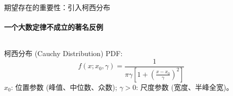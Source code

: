 \documentclass[UTF8]{beamer}
\begin{document}
\begin{frame}[shrink=10]{期望存在的重要性：引入柯西分布}
    \framesubtitle{一个大数定律不成立的著名反例}
    \begin{columns}[T] %
        \begin{column}{0.55\textwidth}
            \begin{block}{柯西分布 (Cauchy Distribution)}
                PDF:
                \[ f(x; x_0, \gamma) = \frac{1}{\pi\gamma \left[1 + \left(\frac{x-x_0}{\gamma}\right)^2\right]} \]
                $x_0$: 位置参数 (峰值、中位数、众数); $\gamma > 0$: 尺度参数 (宽度、半峰全宽)。
                

\end{block}
\end{column}
\end{columns}
\end{frame}
\end{document}
